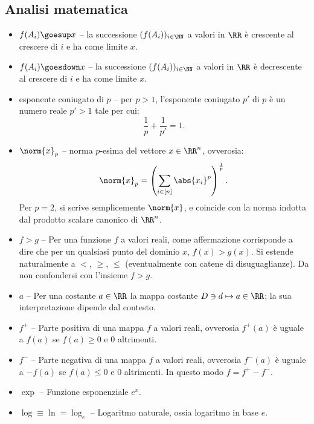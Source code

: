 \begin{multicols*}{2}
    \section*{Analisi matematica}

    \begin{itemize}
        \item $f(A_i) \goesup x$ -- la successione $(f(A_i))_{i \in \NN}$ a valori
        in $\RR$ è crescente al crescere di $i$ e ha come limite $x$.
        \item $f(A_i) \goesdown x$ -- la successione $(f(A_i))_{i \in \NN}$ a valori
        in $\RR$ è decrescente al crescere di $i$ e ha come limite $x$.
        \item esponente coniugato di $p$ -- per $p > 1$, l'esponente coniugato
        $p'$ di $p$ è un numero reale $p' > 1$ tale per cui:
        \[
            \frac{1}{p} + \frac{1}{p'} = 1.
        \]
        \item $\norm{x}_p$ -- norma $p$-esima del vettore $x \in \RR^n$, ovverosia:
        \[
            \norm{x}_p = \left(\sum_{i \in [n]} \abs{x_i}^p\right)^\frac{1}{p}.
        \]
        Per $p = 2$, si scrive semplicemente $\norm{x}$, e coincide con la norma
        indotta dal prodotto scalare canonico di $\RR^n$.
        \item $f > g$ -- Per una funzione $f$ a valori reali, come affermazione
        corrisponde a dire che per un qualsiasi punto del dominio $x$, $f(x) > g(x)$. Si estende naturalmente a $<$, $\geq$, $\leq$ (eventualmente con
        catene di disuguaglianze). Da non
        confondersi con l'insieme $f > g$.
        \item $a$ -- Per una costante $a \in \RR$ la mappa costante $D \ni d \mapsto a \in \RR$;
        la sua interpretazione dipende dal contesto.
        \item $f^+$ -- Parte positiva di una mappa $f$ a valori reali, ovverosia
        $f^+(a)$ è uguale a $f(a)$ se $f(a) \geq 0$ e $0$ altrimenti.
        \item $f^-$ -- Parte negativa di una mappa $f$ a valori reali, ovverosia
        $f^-(a)$ è uguale a $-f(a)$ se $f(a) \leq 0$ e $0$ altrimenti. In questo
        modo $f = f^+ - f^-$.
        \item $\exp$ -- Funzione esponenziale $e^x$.
        \item $\log \equiv \ln = \log_e$ -- Logaritmo naturale, ossia logaritmo in base $e$.
    \end{itemize}


\end{multicols*}
